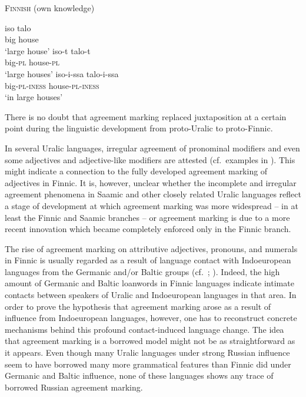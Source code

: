 {\begin{exe}
\ex \textsc{Finnish} (own knowledge)
\begin{xlist}
\ex
\gll	iso talo\\
	big house\\
\glt	‘large house’
\ex	
\gll	iso-t talo-t\\
	big-\textsc{pl} house-\textsc{pl}\\
\glt	‘large houses’
\ex	
\gll	iso-i-ssa	talo-i-ssa\\
	big-\textsc{pl}-\textsc{iness} house-\textsc{pl}-\textsc{iness}\\
\glt	‘in large houses’
\end{xlist}
\end{exe}
There is no doubt that agreement marking replaced juxtaposition at a certain point during the linguistic development from proto-Uralic to proto-Finnic.

In several Uralic languages, irregular agreement of pronominal modifiers and even some adjectives and adjective-like modifiers are attested (cf.~examples in \citealt{honti1997}). This might indicate a connection to the fully developed agreement marking of adjectives in Finnic. It is, however, unclear whether the incomplete and irregular agreement phenomena in Saamic and other closely related Uralic languages reflect a stage of development at which agreement marking was more widespread – in at least the Finnic and Saamic branches – or agreement marking is due to a more recent innovation which became completely enforced only in the Finnic branch. 

The rise of agreement marking on attributive adjectives, pronouns, and numerals in Finnic is usually regarded as a result of language contact with Indoeuropean languages from the Germanic and/or Baltic groups (cf.~\citealt[25]{tauli1955}; \citealt{hajdu1996}). Indeed, the high amount of Germanic and Baltic loanwords in Finnic languages indicate intimate contacts between speakers of Uralic and Indoeuropean languages in that area. In order to prove the hypothesis that agreement marking arose as a result of influence from Indoeuropean languages, however, one has to reconstruct  concrete mechanisms behind this profound contact-induced language change. The idea that agreement marking is a borrowed model might not be as straightforward as it appears. Even though many Uralic languages under strong Russian influence seem to have borrowed many more grammatical features than Finnic did under Germanic and Baltic influence, none of these languages shows any trace of borrowed Russian agreement marking.

}

